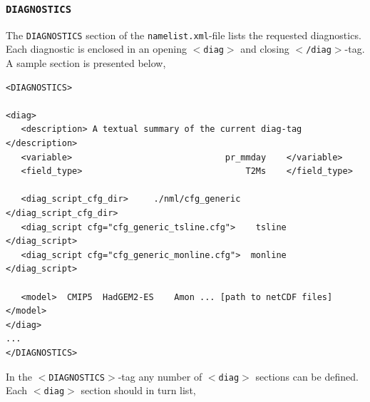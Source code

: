 \documentclass[12pt]{article}
\newcommand{\xmltag}[1]{\texttt{$<$#1$>$}}
\begin{document}
\subsubsection{\texttt{DIAGNOSTICS}}\label{subsubsection:diagnostics}
The \texttt{DIAGNOSTICS} section of the \texttt{namelist.xml}-file
lists the requested diagnostics. Each diagnostic is enclosed in an
opening \xmltag{diag} and closing \xmltag{/diag}-tag. A sample
section is presented below, 
\begin{Verbatim}[frame=single, fontsize=\footnotesize]
<DIAGNOSTICS>

<diag>
   <description> A textual summary of the current diag-tag </description>
   <variable>                              pr_mmday    </variable>
   <field_type>                                T2Ms    </field_type>

   <diag_script_cfg_dir>     ./nml/cfg_generic    </diag_script_cfg_dir>
   <diag_script cfg="cfg_generic_tsline.cfg">    tsline   </diag_script>
   <diag_script cfg="cfg_generic_monline.cfg">  monline   </diag_script>

   <model>  CMIP5  HadGEM2-ES    Amon ... [path to netCDF files] </model>
</diag>
...
</DIAGNOSTICS>
\end{Verbatim}
In the \xmltag{DIAGNOSTICS}-tag any number of \xmltag{diag}
sections can be defined. Each \xmltag{diag} section should in turn
list, 
\end{document}
